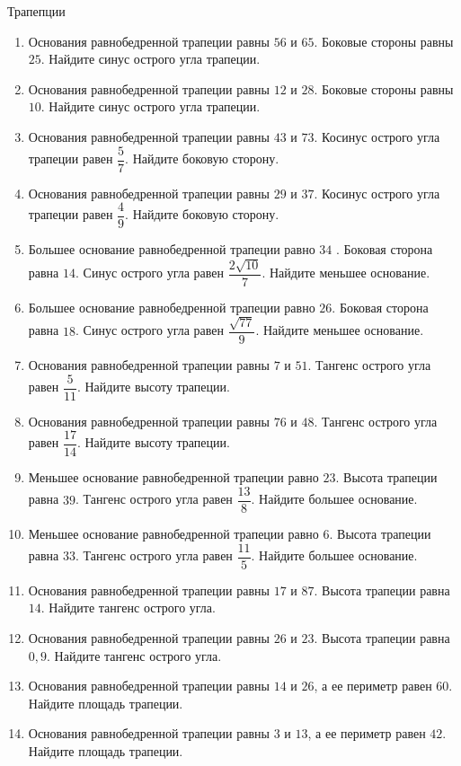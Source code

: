 \documentclass[12pt, a4paper]{article}
\begin{document}
		Трапепции
	\begin{enumerate}
		\item Основания равнобедренной трапеции равны \(56\) и \( 65 \). Боковые стороны равны \( 25 \). Найдите синус острого угла трапеции.
		\item Основания равнобедренной трапеции равны \( 12  \) и \( 28 \). Боковые стороны равны \( 10 \). Найдите синус острого угла трапеции.
		\item Основания равнобедренной трапеции равны \( 43  \) и \( 73 \). Косинус острого угла трапеции равен \( \dfrac{5}{7} \).  Найдите боковую сторону.
		\item Основания равнобедренной трапеции равны \( 29  \) и \( 37 \). Косинус острого угла трапеции равен \( \dfrac{4}{9} \).  Найдите боковую сторону.
		\item Большее основание равнобедренной трапеции равно \( 34 \) . Боковая сторона равна \( 14 \). Синус острого угла равен  \( \dfrac{2\sqrt{10}}{7} \).  Найдите меньшее основание.
		\item Большее основание равнобедренной трапеции равно \( 26 \). Боковая сторона равна \( 18 \). Синус острого угла равен \( \dfrac{\sqrt{77}}{9} \).  Найдите меньшее основание.
		\item Основания равнобедренной трапеции равны \( 7  \) и \( 51 \). Тангенс острого угла равен \( \dfrac{5}{11} \).  Найдите высоту трапеции.
		\item Основания равнобедренной трапеции равны \( 76  \) и \( 48 \). Тангенс острого угла равен  \( \dfrac{17}{14} \).  Найдите высоту трапеции.
		\item Меньшее основание равнобедренной трапеции равно \( 23 \). Высота трапеции равна \( 39 \). Тангенс острого угла равен \( \dfrac{13}{8} \).  Найдите большее основание.
		\item Меньшее основание равнобедренной трапеции равно \( 6 \). Высота трапеции равна \( 33 \). Тангенс острого угла равен \( \dfrac{11}{5}\).  Найдите большее основание.
		\item Основания равнобедренной трапеции равны \( 17  \) и \( 87 \). Высота трапеции равна \( 14 \). Найдите тангенс острого угла.	
		\item Основания равнобедренной трапеции равны \( 26  \) и \( 23 \). Высота трапеции равна \( 0,9 \). Найдите тангенс острого угла.
		\item Основания равнобедренной трапеции равны \( 14  \) и \( 26 \), а ее периметр равен \( 60 \). Найдите площадь трапеции.
		\item Основания равнобедренной трапеции равны \( 3  \) и \( 13 \), а ее периметр равен \( 42 \). Найдите площадь трапеции.

\end{enumerate}
\end{document}
